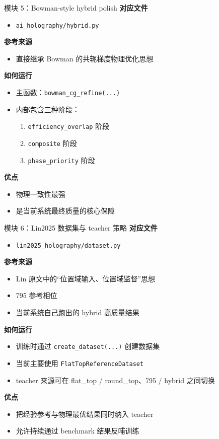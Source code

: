 \documentclass[aspectratio=169,10pt]{ctexbeamer}
\begin{document}
\begin{frame}{模块 5：Bowman-style hybrid polish}
  \textbf{对应文件}
  \begin{itemize}
    \item \texttt{ai\_holography/hybrid.py}
  \end{itemize}

  \textbf{参考来源}
  \begin{itemize}
    \item 直接继承 Bowman 的共轭梯度物理优化思想
  \end{itemize}

  \textbf{如何运行}
  \begin{itemize}
    \item 主函数：\texttt{bowman\_cg\_refine(...)}
    \item 内部包含三种阶段：
    \begin{enumerate}
      \item \texttt{efficiency\_overlap} 阶段
      \item \texttt{composite} 阶段
      \item \texttt{phase\_priority} 阶段
    \end{enumerate}
  \end{itemize}

  \textbf{优点}
  \begin{itemize}
    \item 物理一致性最强
    \item 是当前系统最终质量的核心保障
  \end{itemize}
\end{frame}

\begin{frame}{模块 6：Lin2025 数据集与 teacher 策略}
  \textbf{对应文件}
  \begin{itemize}
    \item \texttt{lin2025\_holography/dataset.py}
  \end{itemize}

  \textbf{参考来源}
  \begin{itemize}
    \item Lin 原文中的“位置域输入、位置域监督”思想
    \item 795 参考相位
    \item 当前系统自己跑出的 hybrid 高质量结果
  \end{itemize}

  \textbf{如何运行}
  \begin{itemize}
    \item 训练时通过 \texttt{create\_dataset(...)} 创建数据集
    \item 当前主要使用 \texttt{FlatTopReferenceDataset}
    \item teacher 来源可在 flat\_top / round\_top、795 / hybrid 之间切换
  \end{itemize}

  \textbf{优点}
  \begin{itemize}
    \item 把经验参考与物理最优结果同时纳入 teacher
    \item 允许持续通过 benchmark 结果反哺训练
  \end{itemize}
\end{frame}
\end{document}
